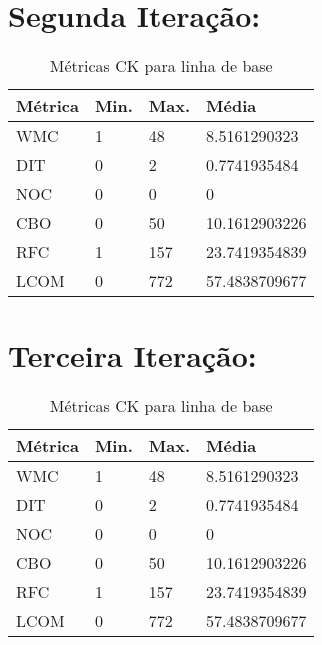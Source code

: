\section{Segunda Iteração:}

\begin{table}
	\centering
    \begin{tabular}{ | l | l | l | l |}
    \hline
    Métrica & Min. & Max. & Média \\ \hline
    WMC & 1 & 48  	& 8.5161290323   \\ \hline
    DIT	& 0	& 2		&0.7741935484\\ \hline
	NOC & 0	& 0		& 0\\ \hline
	CBO	& 0	& 50	& 10.1612903226\\ \hline
	RFC	& 1	& 157	& 23.7419354839\\ \hline
	LCOM	& 0		& 772	& 57.4838709677\\ \hline
    \end{tabular}
    \caption{Métricas CK para linha de base}
    \label{tab:baseline}
\end{table}


\section{Terceira Iteração:} 


\begin{table}
	\centering
    \begin{tabular}{ | l | l | l | l |}
    \hline
    Métrica & Min. & Max. & Média \\ \hline
    WMC & 1 & 48  	& 8.5161290323   \\ \hline
    DIT	& 0	& 2		&0.7741935484\\ \hline
	NOC & 0	& 0		& 0\\ \hline
	CBO	& 0	& 50	& 10.1612903226\\ \hline
	RFC	& 1	& 157	& 23.7419354839\\ \hline
	LCOM	& 0		& 772	& 57.4838709677\\ \hline
    \end{tabular}
    \caption{Métricas CK para linha de base}
    \label{tab:baseline}
\end{table}
